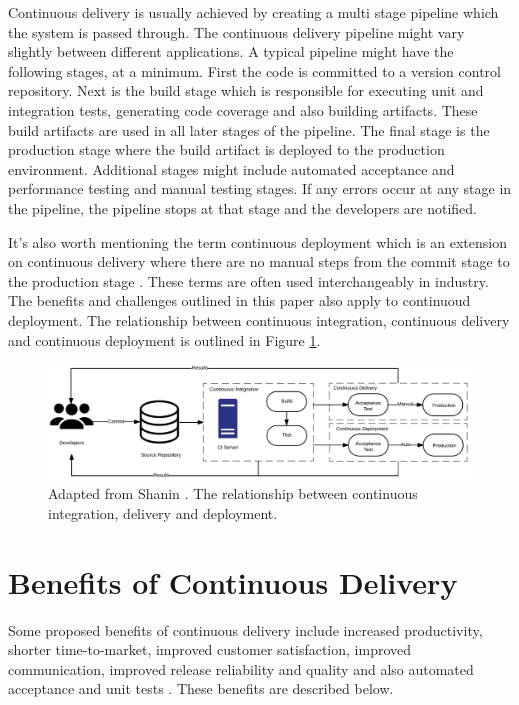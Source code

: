 \documentclass[10pt,journal,compsoc]{IEEEtran}
\begin{document}
Continuous delivery is usually achieved by creating a multi stage pipeline which the system is passed through. The continuous delivery pipeline might vary slightly between different applications. A typical pipeline might have the following stages, at a minimum. First the code is committed to a version control repository. Next is the build stage which is responsible for executing unit and integration tests, generating code coverage and also building artifacts. These build artifacts are used in all later stages of the pipeline. The final stage is the production stage where the build artifact is deployed to the production environment. Additional stages might include automated acceptance and performance testing and manual testing stages. If any errors occur at any stage in the pipeline, the pipeline stops at that stage and the developers are notified.

It's also worth mentioning the term continuous deployment which is an extension on continuous delivery where there are no manual steps from the commit stage to the production stage \cite{LAUKKANEN201755}. These terms are often used interchangeably in industry. The benefits and challenges outlined in this paper also apply to continuoud deployment. The relationship between continuous integration, continuous delivery and continuous deployment is outlined in Figure \ref{fig:relationship}.

\begin{figure}
	\includegraphics[width=\linewidth]{relationship.png}
	\caption{Adapted from Shanin \cite{shahin2017continuous}. The relationship between continuous integration, delivery and deployment.}
	\label{fig:relationship}
\end{figure}

\section{Benefits of Continuous Delivery}
Some proposed benefits of continuous delivery include increased productivity, shorter time-to-market, improved customer satisfaction, improved communication, improved release reliability and quality and  also automated acceptance and unit tests \cite{LAUKKANEN201755}. These benefits are described below.
\end{document}
